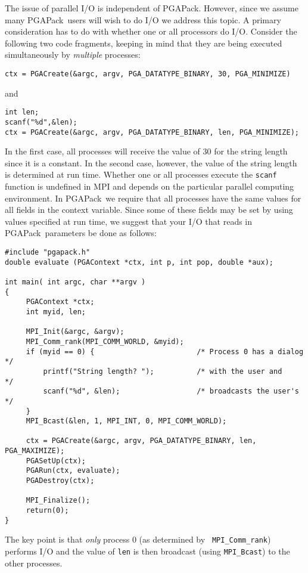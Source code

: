 \documentclass{report}
\newcommand{\pga}{PGAPack}
\begin{document}
The issue of parallel I/O is independent of \pga.  However, since we assume
many \pga\ users will wish to do I/O we address this topic.  A primary
consideration has to do with whether one or all processors do I/O.
Consider the following two code fragments, keeping in mind that they are being
executed simultaneously by {\em multiple} processes:
\begin{verbatim}
ctx = PGACreate(&argc, argv, PGA_DATATYPE_BINARY, 30, PGA_MINIMIZE) 
\end{verbatim}
and 
\begin{verbatim}
int len;
scanf("%d",&len);
ctx = PGACreate(&argc, argv, PGA_DATATYPE_BINARY, len, PGA_MINIMIZE);
\end{verbatim}
In the first case, all processes will receive the value of 30 for the string
length since it is a constant.  In the second case, however, the value of the
string length is determined at run time.  Whether 
one or all processes execute the {\tt scanf} function is undefined in MPI
and depends on the particular parallel computing environment.
In \pga\ we require that all processes have the same values for all
fields in the context variable.  Since some of these fields may be set by using
values specified at run time, we suggest that  your I/O that reads in \pga\
parameters be done as follows:
\begin{verbatim}
#include "pgapack.h"
double evaluate (PGAContext *ctx, int p, int pop, double *aux);

int main( int argc, char **argv )
{
     PGAContext *ctx;
     int myid, len;

     MPI_Init(&argc, &argv);
     MPI_Comm_rank(MPI_COMM_WORLD, &myid);
     if (myid == 0) {                        /* Process 0 has a dialog */
         printf("String length? ");          /* with the user and      */
         scanf("%d", &len);                  /* broadcasts the user's  */
     }
     MPI_Bcast(&len, 1, MPI_INT, 0, MPI_COMM_WORLD);

     ctx = PGACreate(&argc, argv, PGA_DATATYPE_BINARY, len, PGA_MAXIMIZE);
     PGASetUp(ctx);
     PGARun(ctx, evaluate);
     PGADestroy(ctx);

     MPI_Finalize();
     return(0);
}
\end{verbatim}

The key point is that {\em only} process 0 (as determined by {\tt
MPI\_Comm\_rank}) performs I/O and the value of {\tt len} is then broadcast
(using {\tt MPI\_Bcast}) to the other processes.


\end{document}
